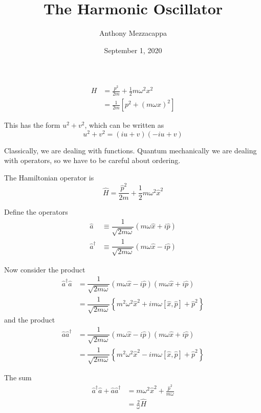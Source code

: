 \documentclass{article}
\title{The Harmonic Oscillator}
\author{Anthony Mezzacappa}
\date{September 1, 2020}
\begin{document}
\maketitle

\begin{align*}
H &= \frac{p^2}{2m} + \frac{1}{2} m \omega^2 x^2 \\
  &= \frac{1}{2m} \left[ p^2 + {\left( m \omega x \right)}^2 \right]
\end{align*}

\noindent This has the form $u^2 + v^2$, which can be written as
\begin{equation*}
u^2 + v^2 = ( i u + v ) ( -i u + v )
\end{equation*}

\noindent Classically, we are dealing with functions. Quantum mechanically we are dealing with operators, so we have to be careful about ordering.

\noindent The Hamiltonian operator is
\begin{equation*}
\hat{H} = \frac{\hat{p}^2}{2m} + \frac{1}{2} m \omega^2 \hat{x}^2
\end{equation*}

\noindent Define the operators
\begin{align*}
\hat{a} &\equiv \dfrac{1}{\sqrt{2 m \omega}} ( m \omega \hat{x} + i \hat{p} ) \\
\hat{a}^\dagger &\equiv \dfrac{1}{\sqrt{2 m \omega}} ( m \omega \hat{x} - i \hat{p} )
\end{align*}


\noindent Now consider the product
\begin{align*}
\hat{a}^\dagger \hat{a} &= \dfrac{1}{\sqrt{2 m \omega}} ( m \omega \hat{x} - i \hat{p} ) ( m \omega \hat{x} + i \hat{p} ) \\
&= \dfrac{1}{\sqrt{2 m \omega}} \left\lbrace m^2 \omega^2 \hat{x}^2 + i m \omega [ \hat{x}, \hat{p} ] + \hat{p}^2 \right\rbrace
\end{align*}
and the product
\begin{align*}
\hat{a} \hat{a}^\dagger &= \dfrac{1}{\sqrt{2 m \omega}} ( m \omega \hat{x} - i \hat{p} ) ( m \omega \hat{x} + i \hat{p} ) \\
&= \dfrac{1}{\sqrt{2 m \omega}} \left\lbrace m^2 \omega^2 \hat{x}^2 - i m \omega [ \hat{x}, \hat{p} ] + \hat{p}^2 \right\rbrace
\end{align*}

\noindent The sum
\begin{align*}
\hat{a}^\dagger \hat{a} + \hat{a} \hat{a}^\dagger &= m \omega^2 \hat{x}^2 + \frac{\hat{p}^2}{ m \omega } \\
&= \tfrac{2}{\omega} \hat{H}
\end{align*}
\end{document}
